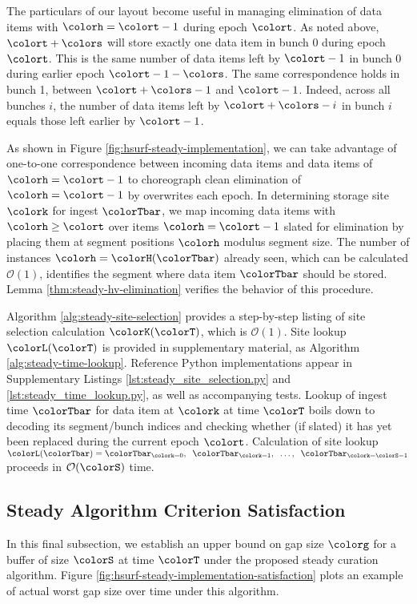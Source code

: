 

The particulars of our layout become useful in managing elimination of data items with \hv{} $\colorh = \colort - 1$ during epoch $\colort$.
As noted above, \hv{} $\colort + \colors$ will store exactly one data item in bunch 0 during epoch $\colort$.
This is the same number of data items left by \hv{} $\colort - 1$ in bunch 0 during earlier epoch $\colort - 1 - \colors$.
The same correspondence holds in bunch 1, between \hv{} $\colort + \colors - 1$ and \hv{} $\colort - 1$.
Indeed, across all bunches $i$, the number of data items left by \hv{} $\colort + \colors - i$ in bunch $i$ equals those left earlier by \hv{} $\colort - 1$.

As shown in Figure \ref{fig:hsurf-steady-implementation}, we can take advantage of one-to-one correspondence between incoming data items and data items of \hv{} $\colorh=\colort-1$ to choreograph clean elimination of \hv{} $\colorh=\colort-1$ by overwrites each epoch.
In determining storage site $\colork$ for ingest $\colorTbar$, we map incoming data items with \hv{} $\colorh \geq \colort$ over items $\colorh = \colort - 1$ slated for elimination by placing them at segment positions $\colorh$ modulus segment size.
The number of \hv{} instances $\colorh = \colorH(\colorTbar)$ already seen, which can be calculated $\mathcal{O}(1)$, identifies the segment where data item $\colorTbar$ should be stored.
Lemma \ref{thm:steady-hv-elimination} verifies the behavior of this procedure.



Algorithm \ref{alg:steady-site-selection} provides a step-by-step listing of site selection calculation $\colorK(\colorT)$, which is $\mathcal{O}(1)$.
Site lookup $\colorL(\colorT)$ is provided in supplementary material, as Algorithm \ref{alg:steady-time-lookup}.
Reference Python implementations appear in Supplementary Listings \ref{lst:steady_site_selection.py} and \ref{lst:steady_time_lookup.py}, as well as accompanying tests.
Lookup of ingest time $\colorTbar$ for data item at $\colork$ at time $\colorT$ boils down to decoding its segment/bunch indices and checking whether (if slated) it has yet been replaced during the current epoch $\colort$.
Calculation of site lookup $\colorL(\colorTbar) = \colorTbar_{\colork=0},\;\; \colorTbar_{\colork=1},\;\; \ldots,\;\; \colorTbar_{\colork=\colorS-1}$ proceeds in $\mathcal{O}(\colorS)$ time.

\subsection{Steady Algorithm Criterion Satisfaction}
\label{sec:stready-satisfaction}

In this final subsection, we establish an upper bound on gap size $\colorg$ for a buffer of size $\colorS$ at time $\colorT$ under the proposed steady curation algorithm.
Figure \ref{fig:hsurf-steady-implementation-satisfaction} plots an example of actual worst gap size over time under this algorithm.


